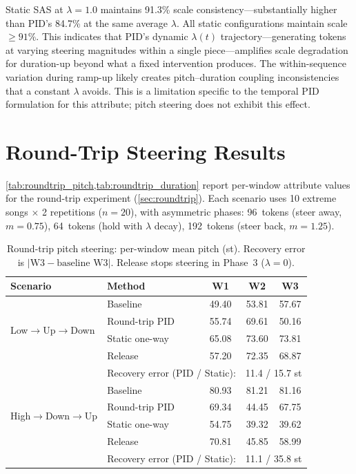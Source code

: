 \documentclass{article}
\theoremstyle{plain}
\begin{document}
Static SAS at $\lambda{=}1.0$ maintains 91.3\% scale consistency---substantially higher than PID's 84.7\% at the same average $\lambda$. All static configurations maintain scale $\geq 91\%$. This indicates that PID's dynamic $\lambda(t)$ trajectory---generating tokens at varying steering magnitudes within a single piece---amplifies scale degradation for duration-up beyond what a fixed intervention produces. The within-sequence variation during ramp-up likely creates pitch--duration coupling inconsistencies that a constant $\lambda$ avoids. This is a limitation specific to the temporal PID formulation for this attribute; pitch steering does not exhibit this effect.

\section{Round-Trip Steering Results}
\label{app:roundtrip}

\cref{tab:roundtrip_pitch,tab:roundtrip_duration} report per-window attribute values for the round-trip experiment (\cref{sec:roundtrip}). Each scenario uses 10 extreme songs $\times$ 2 repetitions ($n{=}20$), with asymmetric phases: 96~tokens (steer away, $m{=}0.75$), 64~tokens (hold with $\lambda$ decay), 192~tokens (steer back, $m{=}1.25$).

\begin{table}[h]
  \caption{Round-trip pitch steering: per-window mean pitch (st). Recovery error is $|\text{W3} - \text{baseline W3}|$. Release stops steering in Phase~3 ($\lambda{=}0$).}
  \label{tab:roundtrip_pitch}
  \begin{center}
  \begin{small}
  \begin{tabular}{llccc}
    \toprule
    Scenario & Method & W1 & W2 & W3 \\
    \midrule
    \multirow{4}{*}{Low$\to$Up$\to$Down}
    & Baseline & 49.40 & 53.81 & 57.67 \\
    & Round-trip PID & 55.74 & 69.61 & 50.16 \\
    & Static one-way & 65.08 & 73.60 & 73.81 \\
    & Release & 57.20 & 72.35 & 68.87 \\
    \midrule
    & \multicolumn{2}{l}{Recovery error (PID / Static):} & \multicolumn{2}{c}{11.4 / 15.7 st} \\
    \midrule
    \multirow{4}{*}{High$\to$Down$\to$Up}
    & Baseline & 80.93 & 81.21 & 81.16 \\
    & Round-trip PID & 69.34 & 44.45 & 67.75 \\
    & Static one-way & 54.75 & 39.32 & 39.62 \\
    & Release & 70.81 & 45.85 & 58.99 \\
    \midrule
    & \multicolumn{2}{l}{Recovery error (PID / Static):} & \multicolumn{2}{c}{11.1 / 35.8 st} \\
    \bottomrule
  \end{tabular}
  \end{small}
  \end{center}
\end{table}
\end{document}
